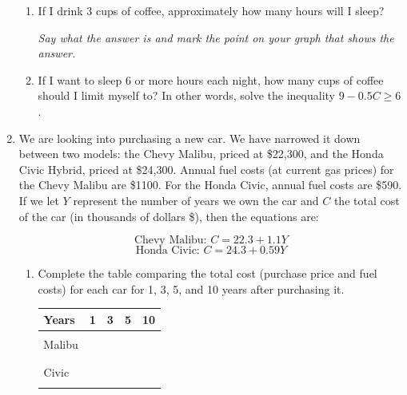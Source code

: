 \documentclass[12pt]{article}
\begin{document}
\begin{enumerate}
\begin{enumerate}
\item If I drink 3 cups of coffee, approximately how many hours will I sleep?

\emph{Say what the answer is and mark the point on your graph that shows the answer.}
\vfill
\item If I want to sleep 6 or more hours each night, how many cups of coffee should I limit myself to?  In other words, solve the inequality $9-0.5C \ge 6$.
\vfill
\vfill
\vfill
\end{enumerate}

\newpage
\item We are looking into purchasing a new car.  We have narrowed it down between two models: the Chevy Malibu, priced at \$22,300, and the Honda Civic Hybrid, priced at \$24,300.  Annual fuel costs (at current gas prices) for the Chevy Malibu are \$1100.  For the Honda Civic, annual fuel costs are \$590.   If we let $Y$ represent the number of years we own the car and $C$ the total cost of the car (in thousands of dollars \$), then the equations are:

$$\text{Chevy Malibu:  }C = 22.3 + 1.1Y$$
$$\text{Honda Civic:  }C = 24.3 + 0.59Y$$

\begin{enumerate}
\item Complete the table comparing the total cost (purchase price and fuel costs) for each car for 1, 3, 5, and 10 years after purchasing it.


\begin{center}
\begin{tabular} {|l |c |c |c |c |} \hline
Years &\hspace{.25in} 1\hspace{.25in} & \hspace{.25in}3\hspace{.25in} & \hspace{.25in}5\hspace{.25in} &\hspace{.25in}10\hspace{.25in} \\ \hline
&&&& \\ 
Malibu &&&& \\ 
&&&& \\ \hline
&&&& \\ 
Civic &&&& \\  
&&&& \\ \hline
\end{tabular}
\end{center}




\end{enumerate}
\end{enumerate}
\end{document}
